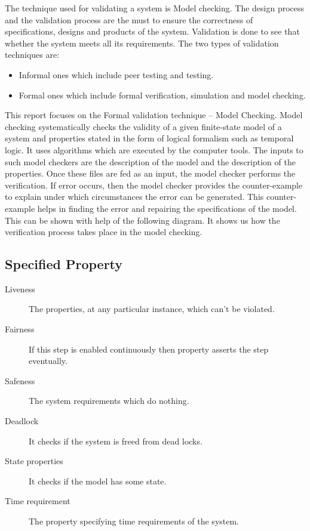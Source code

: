 \documentclass{article}
\begin{document}
The technique used for validating a system is Model checking. The design process and the validation process are the must to ensure the correctness of specifications, designs and products of the system. Validation is done to see that whether the system meets all its requirements.
The two types of validation techniques are:
\begin{itemize}
\item Informal ones which include peer testing and testing.
\item Formal ones which include formal verification, simulation and model checking.
\end{itemize}
This report focuses on the Formal validation technique – Model Checking.
Model checking systematically checks the validity of a given finite-state model of a system and properties stated in the form of logical formalism such as temporal logic. It uses algorithms which are executed by the computer tools. The inputs to such model checkers are the description of the model and the description of the properties. Once these files are fed as an input, the model checker performs the verification. If error occurs, then the model checker provides the counter-example to explain under which circumstances the error can be generated. This counter-example helps in finding the error and repairing the specifications of the model. This can be shown with help of the following diagram. It shows us how the verification process takes place in the model checking.


\subsection{Specified Property}
\label{sec:specprop}

\begin{description}
\item[Liveness] The properties, at any particular instance, which can’t be violated.
\item[Fairness] If this step is enabled continuously then property asserts the step eventually.
\item[Safeness] The system requirements which do nothing.
\item[Deadlock] It checks if the system is freed from dead locks.
\item[State properties] It checks if the model has some state.
\item[Time requirement] The property specifying time requirements of the system.
\end{description}
\end{document}
